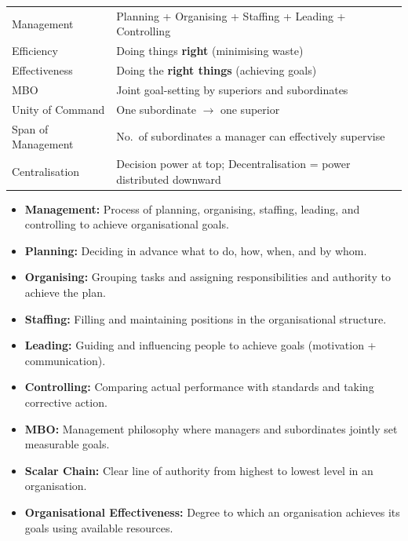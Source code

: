\documentclass[12pt,a4paper]{article}
\renewcommand{\arraystretch}{1.45}
\begin{document}
\begin{tcolorbox}[formulabox, title={\textbf{Key Concepts at a Glance}}]
\renewcommand{\arraystretch}{1.3}
\begin{tabularx}{\linewidth}{B{4.0cm} X}Management & Planning + Organising + Staffing + Leading + Controlling \\[3pt]
Efficiency & Doing things \textbf{right} (minimising waste) \\[3pt]
Effectiveness & Doing the \textbf{right things} (achieving goals) \\[3pt]
MBO & Joint goal-setting by superiors and subordinates \\[3pt]
Unity of Command & One subordinate $\rightarrow$ one superior \\[3pt]
Span of Management & No.\ of subordinates a manager can effectively supervise \\[3pt]
Centralisation & Decision power at top; Decentralisation = power distributed downward \\
\end{tabularx}
\end{tcolorbox}

\begin{tcolorbox}[defbox, title={\textbf{One-Line Definitions}}]
\begin{itemize}[leftmargin=*, itemsep=2pt, topsep=0pt]
  \item \textbf{Management:} Process of planning, organising, staffing, leading, and controlling to achieve organisational goals.
  \item \textbf{Planning:} Deciding in advance what to do, how, when, and by whom.
  \item \textbf{Organising:} Grouping tasks and assigning responsibilities and authority to achieve the plan.
  \item \textbf{Staffing:} Filling and maintaining positions in the organisational structure.
  \item \textbf{Leading:} Guiding and influencing people to achieve goals (motivation + communication).
  \item \textbf{Controlling:} Comparing actual performance with standards and taking corrective action.
  \item \textbf{MBO:} Management philosophy where managers and subordinates jointly set measurable goals.
  \item \textbf{Scalar Chain:} Clear line of authority from highest to lowest level in an organisation.
  \item \textbf{Organisational Effectiveness:} Degree to which an organisation achieves its goals using available resources.
\end{itemize}
\end{tcolorbox}
\end{document}
